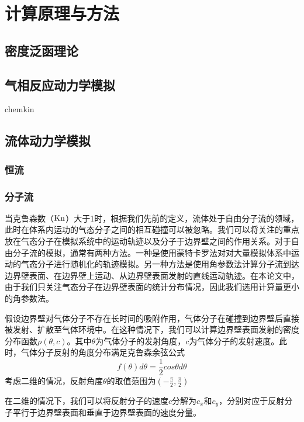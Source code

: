 \chapter{计算原理与方法}
\section{密度泛函理论}

\section{气相反应动力学模拟}
chemkin
\section{流体动力学模拟}
    \subsection{恒流}
    \subsection{分子流}
    当克鲁森数（${\rm Kn}$）大于1时，根据我们先前的定义，流体处于自由分子流的领域，此时在体系内运功的气态分子之间的相互碰撞可以被忽略。我们可以将关注的重点放在气态分子在模拟系统中的运动轨迹以及分子于边界壁之间的作用关系。对于自由分子流的模拟，通常有两种方法。一种是使用蒙特卡罗法对对大量模拟体系中运动的气态分子进行随机化的轨迹模拟。另一种方法是使用角参数法计算分子流到达边界壁表面、在边界壁上运动、从边界壁表面发射的直线运动轨迹。在本论文中，由于我们只关注气态分子在边界壁表面的统计分布情况，因此我们选用计算量更小的角参数法。

    假设边界壁对气体分子不存在长时间的吸附作用，气体分子在碰撞到边界壁后直接被发射、扩散至气体环境中。在这种情况下，我们可以计算边界壁表面发射的密度分布函数$\rho\left(\theta, c\right)$。其中$\theta$为气体分子的发射角度，$c$为气体分子的发射速度。此时，气体分子反射的角度分布满足克鲁森余弦公式\chinesecolon
    \begin{equation}
        f\left(\theta\right)d\theta =\frac{1}{2}cos\theta d\theta 
    \end{equation}    
    考虑二维的情况，反射角度$\theta$的取值范围为$\left(-\frac{\pi}{2},\frac{\pi}{2}\right)$

    在二维的情况下，我们可以将反射分子的速度$c$分解为$c_x$和$c_y$，分别对应于反射分子平行于边界壁表面和垂直于边界壁表面的速度分量。

